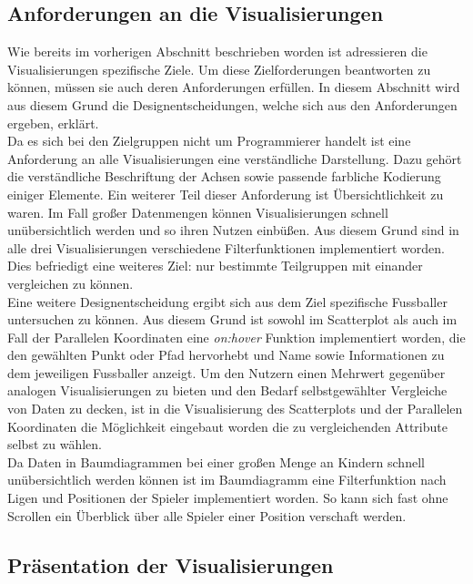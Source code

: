 \documentclass[usegeometry=true]{scrartcl}
\begin{document}
\subsection{Anforderungen an die Visualisierungen}
Wie bereits im vorherigen Abschnitt beschrieben worden ist adressieren die Visualisierungen spezifische Ziele. Um diese Zielforderungen beantworten zu können, müssen sie auch deren Anforderungen erfüllen. In diesem Abschnitt wird aus diesem Grund die Designentscheidungen, welche sich aus den Anforderungen ergeben, erklärt.\\
Da es sich bei den Zielgruppen nicht um Programmierer handelt ist eine Anforderung an alle Visualisierungen eine verständliche Darstellung. Dazu gehört die verständliche Beschriftung der Achsen sowie passende farbliche Kodierung einiger Elemente. Ein weiterer Teil dieser Anforderung ist Übersichtlichkeit zu waren. Im Fall großer Datenmengen können Visualisierungen schnell unübersichtlich werden und so ihren Nutzen einbüßen. Aus diesem Grund sind in alle drei Visualisierungen verschiedene Filterfunktionen implementiert worden. Dies befriedigt eine weiteres Ziel: nur bestimmte Teilgruppen mit einander vergleichen zu können.\\
Eine weitere Designentscheidung ergibt sich aus dem Ziel spezifische Fussballer untersuchen zu können. Aus diesem Grund ist sowohl im Scatterplot als auch im Fall der Parallelen Koordinaten eine \textit{on:hover} Funktion implementiert worden, die den gewählten Punkt oder Pfad hervorhebt und Name sowie Informationen zu dem jeweiligen Fussballer anzeigt.
Um den Nutzern einen Mehrwert gegenüber analogen Visualisierungen zu bieten und den Bedarf selbstgewählter Vergleiche von Daten zu decken, ist in die Visualisierung des Scatterplots und der Parallelen Koordinaten die Möglichkeit eingebaut worden die zu vergleichenden Attribute selbst zu wählen.\\
Da Daten in Baumdiagrammen bei einer großen Menge an Kindern schnell unübersichtlich werden können ist im Baumdiagramm eine Filterfunktion nach Ligen und Positionen der Spieler implementiert worden. So kann sich fast ohne Scrollen ein Überblick über alle Spieler einer Position verschaft werden.\\


\subsection{Präsentation der Visualisierungen}
\end{document}
